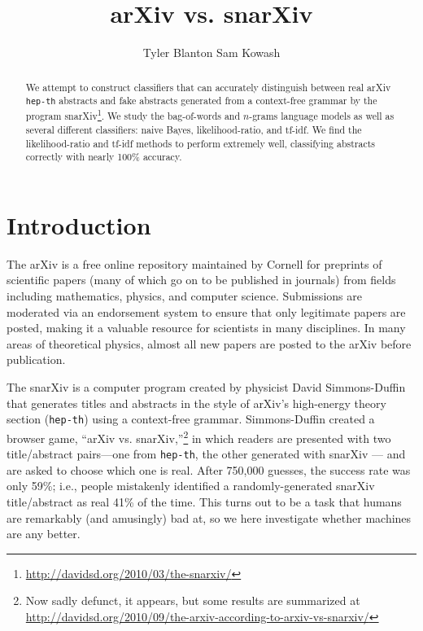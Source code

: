 \documentclass{article}
\title{arXiv vs. snarXiv}
\author{Tyler Blanton \And Sam Kowash}
\begin{document}

\maketitle

\begin{abstract}
We attempt to construct classifiers that can accurately distinguish between real arXiv \texttt{hep-th} abstracts and fake abstracts generated from a context-free grammar by the program snarXiv\footnote{\url{http://davidsd.org/2010/03/the-snarxiv/}}.
We study the bag-of-words and $n$-grams language models as well as several different classifiers: naive Bayes, likelihood-ratio, and tf-idf.
We find the likelihood-ratio and tf-idf methods to perform extremely well, classifying abstracts correctly with nearly 100\% accuracy.
\end{abstract}




\section{Introduction} \label{sec:intro}
The arXiv is a free online repository maintained by Cornell for preprints of scientific papers (many of which go on to be published in journals) from fields including mathematics, physics, and computer science.
Submissions are moderated via an endorsement system to ensure that only legitimate papers are posted, making it a valuable resource for scientists in many disciplines. In many areas of theoretical physics, almost all new papers are posted to the arXiv before publication.

The snarXiv is a computer program created by physicist David Simmons-Duffin that generates titles and abstracts in the style of arXiv's high-energy theory section (\texttt{hep-th}) using a context-free grammar.
Simmons-Duffin created a browser game, ``arXiv vs. snarXiv,''\footnote{Now sadly defunct, it appears, but some results are summarized at \url{http://davidsd.org/2010/09/the-arxiv-according-to-arxiv-vs-snarxiv/}} in which readers are presented with two title/abstract pairs---one from \texttt{hep-th}, the other generated with snarXiv --- and are asked to choose which one is real.
After 750,000 guesses, the success rate was only 59\%; i.e., people mistakenly identified a randomly-generated snarXiv title/abstract as real 41\% of the time.
This turns out to be a task that humans are remarkably (and amusingly) bad at, so we here investigate whether machines are any better.
\end{document}
